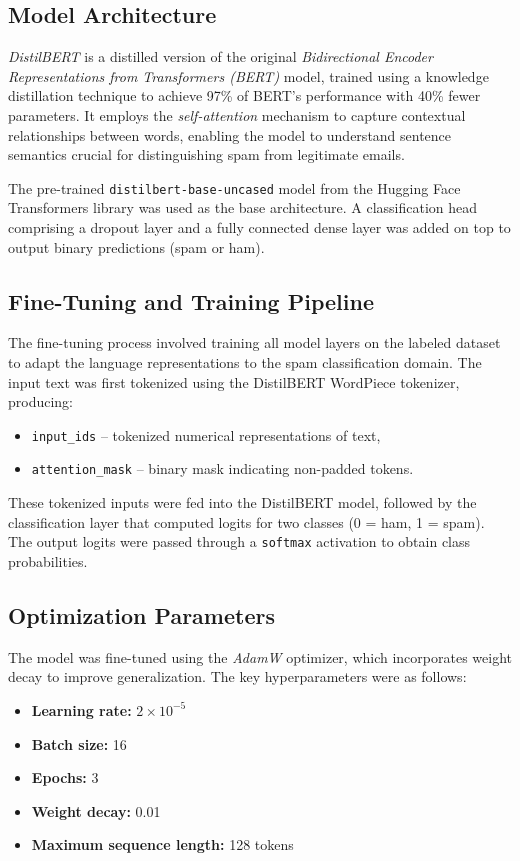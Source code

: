 \documentclass[12pt]{article}
\begin{document}
\subsection{Model Architecture}

\textit{DistilBERT} is a distilled version of the original \textit{Bidirectional Encoder Representations from Transformers (BERT)} model, trained using a knowledge distillation technique to achieve 97\% of BERT’s performance with 40\% fewer parameters.  
It employs the \textit{self-attention} mechanism to capture contextual relationships between words, enabling the model to understand sentence semantics crucial for distinguishing spam from legitimate emails.

The pre-trained \texttt{distilbert-base-uncased} model from the Hugging Face Transformers library was used as the base architecture. A classification head comprising a dropout layer and a fully connected dense layer was added on top to output binary predictions (spam or ham).

\subsection{Fine-Tuning and Training Pipeline}

The fine-tuning process involved training all model layers on the labeled dataset to adapt the language representations to the spam classification domain. The input text was first tokenized using the DistilBERT WordPiece tokenizer, producing:
\begin{itemize}
    \item \texttt{input\_ids} – tokenized numerical representations of text,
    \item \texttt{attention\_mask} – binary mask indicating non-padded tokens.
\end{itemize}

These tokenized inputs were fed into the DistilBERT model, followed by the classification layer that computed logits for two classes (0 = ham, 1 = spam).  
The output logits were passed through a \texttt{softmax} activation to obtain class probabilities.

\subsection{Optimization Parameters}

The model was fine-tuned using the \textit{AdamW} optimizer, which incorporates weight decay to improve generalization. The key hyperparameters were as follows:
\begin{itemize}
    \item \textbf{Learning rate:} $2 \times 10^{-5}$
    \item \textbf{Batch size:} 16
    \item \textbf{Epochs:} 3
    \item \textbf{Weight decay:} 0.01
    \item \textbf{Maximum sequence length:} 128 tokens
\end{itemize}
\end{document}
